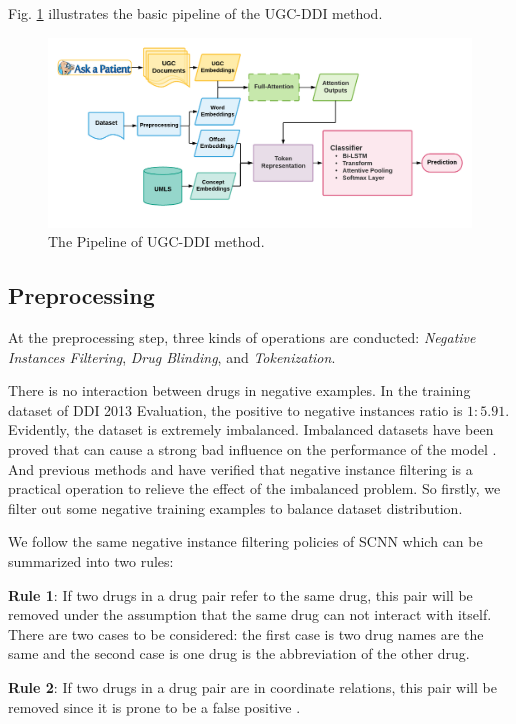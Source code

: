 \documentclass[conference]{IEEEtran}
\begin{document}
Fig. \ref{fig:pipeline} illustrates the basic pipeline of the UGC-DDI method.

\begin{figure}[ht]
	\centering
	\includegraphics[scale=0.75]{figures/flow-chart-lite}
	\caption{The Pipeline of UGC-DDI method.}
	\label{fig:pipeline}
\end{figure}

\subsection{Preprocessing}

At the preprocessing step, three kinds of operations are conducted: \emph{Negative Instances Filtering}, 
\emph{Drug Blinding}, and \emph{Tokenization}.

There is no interaction between drugs in negative examples.
In the training dataset of DDI 2013 Evaluation, the positive to negative instances ratio is $1 \colon 5.91$.
Evidently, the dataset is extremely imbalanced.
Imbalanced datasets have been proved that can cause a strong bad influence on the performance of the model \cite{lopez_insight_2013}.
And previous methods \cite{zhao_drug_2016} and \cite{sahu_drug-drug_2017} have verified that negative instance filtering
is a practical operation to relieve the effect of the imbalanced problem.
So firstly, we filter out some negative training examples to balance dataset distribution.

We follow the same negative instance filtering policies of SCNN \cite{zhao_drug_2016} which can be summarized into two rules:

\begin{framed}
\textbf{Rule 1}: If two drugs in a drug pair refer to the same drug,
this pair will be removed under the assumption that the same drug can not interact with itself.
There are two cases to be considered: the first case is two drug names are the same and the second case is one drug is the abbreviation of the other drug.

\bigbreak

\textbf{Rule 2}: If two drugs in a drug pair are in coordinate relations,
this pair will be removed since it is prone to be a false positive \cite{segura-bedmar_lessons_2014}.
\end{framed}
\end{document}
